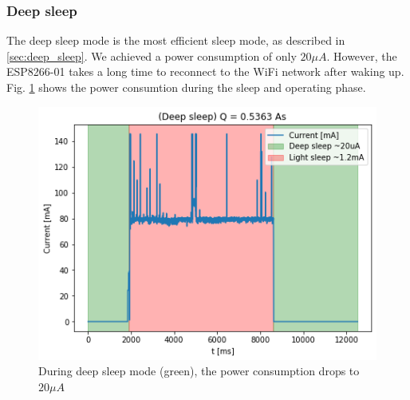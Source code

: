 \subsubsection{Deep sleep}
The deep sleep mode is the most efficient sleep mode, as described in \ref{sec:deep_sleep}. 
We achieved a power consumption of only $20 \mu A$. 
However, the ESP8266-01 takes a long time to reconnect to the WiFi network after waking up.
Fig. \ref{fig:deep_sleep} shows the power consumtion during the sleep and operating phase.
\begin{figure}[H]
    \includegraphics[width = \linewidth]{fig/deep_sleep.png}
    \caption{During deep sleep mode (green), the power consumption drops to $20 \mu A$}
    \label{fig:deep_sleep}
\end{figure}